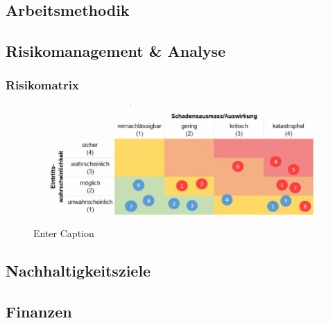 \documentclass{article}
\begin{document}
\subsection{Arbeitsmethodik}

\subsection{Risikomanagement \& Analyse}

\subsubsection{Risikomatrix}
\begin{figure}[H]
    \centering
    \includegraphics[width=0.8\linewidth]{Images/Risikomatrix.png}
    \caption{Enter Caption}
    \label{fig:enter-label}
\end{figure}

\subsection{Nachhaltigkeitsziele}
\subsection{Finanzen}

\newpage
\listoffigures %
\listoftables %




\end{document}
